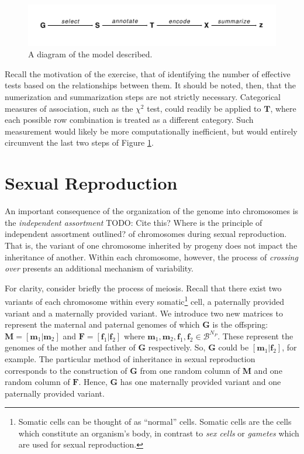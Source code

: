 \documentclass{article}
\newcommand{\ve}[1]{\mathbf{#1}}           %
\newcommand{\m}[1]{\mathbf{#1}}               %
\newcommand{\TODO}[1]{{\color{brickred} TODO:  {#1}}}
\begin{document}
\begin{figure}[!ht]
  \begin{center}
  \includegraphics[scale = 1]{./img/modelDiagram.pdf}
  \caption{A diagram of the model described.}
  \label{fig:modelDiagram}
\end{center}
\end{figure}

Recall the motivation of the exercise, that of identifying the number of effective tests based on the relationships between them. It should be noted, then, that the numerization and summarization steps are not strictly necessary. Categorical measures of association, such as the $\chi^2$ test, could readily be applied to $\m{T}$, where each possible row combination is treated as a different category. Such measurement would likely be more computationally inefficient, but would entirely circumvent the last two steps of Figure \ref{fig:modelDiagram}. 

\section{Sexual Reproduction} \label{subsec:crossingover}

An important consequence of the organization of the genome into chromosomes is the \textit{independent assortment} \TODO{Cite this? Where is the principle of independent assortment outlined?} of chromosomes during sexual reproduction. That is, the variant of one chromosome inherited by progeny does not impact the inheritance of another. Within each chromosome, however, the process of \textit{crossing over} presents an additional mechanism of variability.

For clarity, consider briefly the process of meiosis. Recall that there exist two variants of each chromosome within every somatic\footnote{Somatic cells can be thought of as ``normal'' cells. Somatic cells are the cells which constitute an organism's body, in contrast to \textit{sex cells} or \textit{gametes} which are used for sexual reproduction.} cell, a paternally provided variant and a maternally provided variant. We introduce two new matrices to represent the maternal and paternal genomes of which $\m{G}$ is the offspring: $\m{M} = [\ve{m}_1| \ve{m}_2]$ and $\m{F} = [\ve{f}_1| \ve{f}_2]$ where $\ve{m}_1, \ve{m}_2, \ve{f}_1, \ve{f}_2 \in \mathcal{B}^{N_P}$. These represent the genomes of the mother and father of $\m{G}$ respectively. So, $\m{G}$ could be $[\ve{m}_1 | \ve{f}_2]$, for example. The particular method of inheritance in sexual reproduction corresponds to the construction of $\m{G}$ from one random column of $\m{M}$ and one random column of $\m{F}$. Hence, $\m{G}$ has one maternally provided variant and one paternally provided variant.
\end{document}
